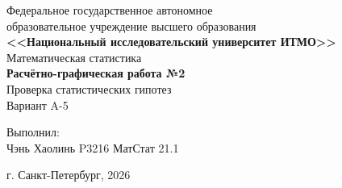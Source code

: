 \begin{titlepage}
    \centering
    Федеральное государственное автономное \\
    образовательное учреждение высшего образования \\
    \textbf{<<Национальный исследовательский университет ИТМО>>} \\

    \vfill
    Математическая статистика \\
    \vspace{0.5\baselineskip}
    \textbf{Расчётно-графическая работа №2} \\
    \vspace{0.5\baselineskip}
    Проверка статистических гипотез \\
    \vspace{0.5\baselineskip}
    Вариант A-5 \\

    \vfill

    \flushright
    Выполнил:\\
    Чэнь Хаолинь P3216 МатСтат 21.1\\

    \vspace{4\baselineskip}

    \centering
    г. Санкт-Петербург, 2026

\end{titlepage}
